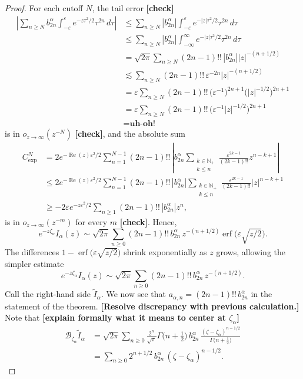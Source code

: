 \documentclass{article}
\theoremstyle{definition}
\newcommand{\borel}{\mathcal{B}}
\begin{document}
\begin{proof}
\color{Purple}
For each cutoff $N$, the tail error \textbf{[check]}
\begin{align*}
\left| \sum_{n \ge N} b_{2n}^\alpha \int_{-\varepsilon}^\varepsilon e^{-z\tau^2/2} \tau^{2n}\,d\tau \right| & \le \sum_{n \ge N} \left| b_{2n}^\alpha \right| \int_{-\varepsilon}^\varepsilon e^{-|z|\tau^2/2} \tau^{2n}\,d\tau \\
& \le \sum_{n \ge N} \left| b_{2n}^\alpha \right| \int_{-\infty}^\infty e^{-|z|\tau^2/2} \tau^{2n}\,d\tau \\
& = \sqrt{2\pi} \sum_{n \ge N} (2n-1)!!\,\left| b_{2n}^\alpha \right| |z|^{-(n+1/2)} \\
& \lesssim \sum_{n \ge N} (2n-1)!!\,\varepsilon^{-2n} |z|^{-(n+1/2)} \\
& = \varepsilon \sum_{n \ge N} (2n-1)!!\,\big(\varepsilon^{-1}\big)^{2n+1} \big(|z|^{-1/2}\big)^{2n+1} \\
& = \varepsilon \sum_{n \ge N} (2n-1)!!\,\big(\varepsilon^{-1} |z|^{-1/2}\big)^{2n+1} \\
& = \textbf{uh-oh!}
\end{align*}
\color{violet}
is in $o_{z \to \infty}(z^{-N})$ \textbf{[check]}, and the absolute sum
\begin{align*}
C_\text{exp}^N & = 2e^{-\operatorname{Re}(z)\varepsilon^2/2} \sum_{n = 1}^{N-1} (2n-1)!!\,\left| b_{2n}^\alpha \sum_{\substack{k \in \mathbb{N}_+ \\ k \le n}} \frac{\varepsilon^{2k-1}}{(2k-1)!!} z^{n-k+1} \right| \\
& \le 2e^{-\operatorname{Re}(z)\varepsilon^2/2} \sum_{n = 1}^{N-1} (2n-1)!!\,\left|b_{2n}^\alpha\right| \sum_{\substack{k \in \mathbb{N}_+ \\ k \le n}} \frac{\varepsilon^{2k-1}}{(2k-1)!!} |z|^{n-k+1} \\
& \ge -2\varepsilon e^{-z\varepsilon^2/2} \sum_{n \ge 1} (2n-1)!!\,\left|b_{2n}^\alpha\right| z^n,
\end{align*}
is in $o_{z \to \infty}(z^{-m})$ for every $m$ \textbf{[check]}.\color{black} Hence,
\[ e^{-z\zeta_\alpha} I_\alpha(z) \sim \sqrt{2\pi} \sum_{n \ge 0} (2n-1)!!\,b_{2n}^\alpha\,z^{-(n+1/2)} \operatorname{erf}\big(\varepsilon \sqrt{z/2}\big). \]
The differences $1 - \operatorname{erf}\big(\varepsilon \sqrt{z/2}\big)$ shrink exponentially as $z$ grows, allowing the simpler estimate
\[ e^{-z\zeta_\alpha} I_\alpha(z) \sim \sqrt{2\pi} \sum_{n \ge 0} (2n-1)!!\,b_{2n}^\alpha\,z^{-(n+1/2)}. \]
Call the right-hand side $\tilde{I}_\alpha$. We now see that $a_{\alpha,n} = (2n-1)!!\,b_{2n}^\alpha$ in the statement of the theorem. \textbf{[Resolve discrepancy with previous calculation.]} Note that \textbf{[explain formally what it means to center at $\zeta_\alpha$]}
\begin{align*}
\borel_{\zeta_\alpha} \tilde{I}_\alpha & = \sqrt{2\pi} \sum_{n \ge 0} \frac{2^n}{\sqrt{\pi}} \Gamma\big(n+\tfrac{1}{2}\big)\,b_{2n}^\alpha\,\frac{(\zeta - \zeta_\alpha)^{n-1/2}}{\Gamma\big(n+\tfrac{1}{2}\big)} \\
& = \sum_{n \ge 0} 2^{n+1/2}\,b_{2n}^\alpha\,(\zeta - \zeta_\alpha)^{n-1/2}.
\end{align*}


\end{proof}
\end{document}
